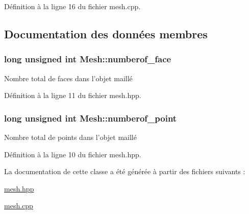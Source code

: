 Définition à la ligne 16 du fichier mesh.\-cpp.



\subsection{Documentation des données membres}
\hypertarget{class_mesh_a82d6983d05490dd70b4daef4e9434d3b}{
\subsubsection[{numberof\-\_\-face}]{\setlength{\rightskip}{0pt plus 5cm}long unsigned int Mesh\-::numberof\-\_\-face\hspace{0.3cm}{\ttfamily [private]}}}\label{class_mesh_a82d6983d05490dd70b4daef4e9434d3b}
Nombre total de faces dans l'objet maillé 

Définition à la ligne 11 du fichier mesh.\-hpp.

\hypertarget{class_mesh_a26a55fa0390c41fda68fb97bf89b06be}{
\subsubsection[{numberof\-\_\-point}]{\setlength{\rightskip}{0pt plus 5cm}long unsigned int Mesh\-::numberof\-\_\-point\hspace{0.3cm}{\ttfamily [private]}}}\label{class_mesh_a26a55fa0390c41fda68fb97bf89b06be}
Nombre total de points dans l'objet maillé 

Définition à la ligne 10 du fichier mesh.\-hpp.



La documentation de cette classe a été générée à partir des fichiers suivants \-:\begin{DoxyCompactItemize}
\item 
\hyperlink{mesh_8hpp}{mesh.\-hpp}\item 
\hyperlink{mesh_8cpp}{mesh.\-cpp}\end{DoxyCompactItemize}
